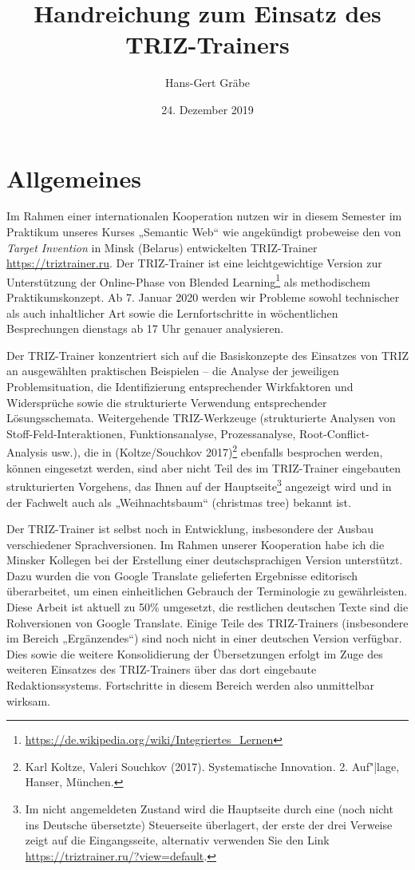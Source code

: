 \documentclass[11pt,a4paper]{article}
\title{Handreichung zum Einsatz des TRIZ-Trainers}
\author{Hans-Gert Gr\"abe}
\date{24. Dezember 2019}
\begin{document}
\maketitle

\section{Allgemeines}

Im Rahmen einer internationalen Kooperation nutzen wir in diesem Semester im
Praktikum unseres Kurses „Semantic Web“ wie angekündigt probeweise den von
\emph{Target Invention} in Minsk (Belarus) entwickelten TRIZ-Trainer
\url{https://triztrainer.ru}.  Der TRIZ-Trainer ist eine leichtgewichtige
Version zur Unterstützung der Online-Phase von Blended
Learning\footnote{\url{https://de.wikipedia.org/wiki/Integriertes_Lernen}} als
methodischem Praktikumskonzept.  Ab 7. Januar 2020 werden wir Probleme sowohl
technischer als auch inhaltlicher Art sowie die Lernfortschritte in
wöchentlichen Besprechungen dienstags ab 17 Uhr genauer analysieren.

Der TRIZ-Trainer konzentriert sich auf die Basiskonzepte des Einsatzes von
TRIZ an ausgewählten praktischen Beispielen -- die Analyse der jeweiligen
Problemsituation, die Identifizierung entsprechender Wirkfaktoren und
Widersprüche sowie die strukturierte Verwendung entsprechender
Lösungsschemata.  Weitergehende TRIZ-Werkzeuge (strukturierte Analysen von
Stoff-Feld-Interaktionen, Funktionsanalyse, Prozessanalyse,
Root-Conflict-Analysis usw.), die in (Koltze/Souchkov 2017)\footnote{Karl
  Koltze, Valeri Souchkov (2017). Systematische Innovation.  2. Auf"|lage,
  Hanser, München.} ebenfalls besprochen werden, können eingesetzt werden,
sind aber nicht Teil des im TRIZ-Trainer eingebauten strukturierten Vorgehens,
das Ihnen auf der Hauptseite\footnote{Im nicht angemeldeten Zustand wird die
  Hauptseite durch eine (noch nicht ins Deutsche übersetzte) Steuerseite
  überlagert, der erste der drei Verweise zeigt auf die Eingangsseite,
  alternativ verwenden Sie den Link
  \url{https://triztrainer.ru/?view=default}.} angezeigt wird und in der
Fachwelt auch als „Weihnachtsbaum“ (christmas tree) bekannt ist.

Der TRIZ-Trainer ist selbst noch in Entwicklung, insbesondere der Ausbau
verschiedener Sprachversionen.  Im Rahmen unserer Kooperation habe ich die
Minsker Kollegen bei der Erstellung einer deutschsprachigen Version
unterstützt.  Dazu wurden die von Google Translate gelieferten Ergebnisse
editorisch überarbeitet, um einen einheitlichen Gebrauch der Terminologie zu
gewährleisten. Diese Arbeit ist aktuell zu 50\% umgesetzt, die restlichen
deutschen Texte sind die Rohversionen von Google Translate.  Einige Teile des
TRIZ-Trainers (insbesondere im Bereich „Ergänzendes“) sind noch nicht in einer
deutschen Version verfügbar. Dies sowie die weitere Konsolidierung der
Übersetzungen erfolgt im Zuge des weiteren Einsatzes des TRIZ-Trainers über
das dort eingebaute Redaktionssystems. Fortschritte in diesem Bereich werden
also unmittelbar wirksam.
\end{document}
